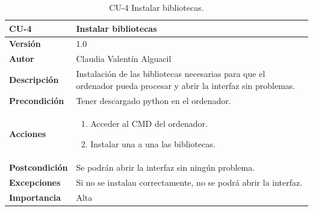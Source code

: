 \begin{table}[p]
	\centering
	\begin{tabularx}{\linewidth}{ p{} p{} }
		\toprule
		\textbf{CU-4} & \textbf{Instalar bibliotecas}\\
		\toprule
		\textbf{Versión}              & 1.0    \\
		\textbf{Autor}                & Claudia Valentín Alguacil \\
		
		\textbf{Descripción}          & Instalación de las bibliotecas necesarias para que el ordenador pueda procesar y abrir la interfaz sin problemas. \\
		\textbf{Precondición}         & Tener descargado python en el ordenador. \\
		\textbf{Acciones}             &
		\begin{enumerate}
			\def\labelenumi{\arabic{enumi}.}
			\tightlist
			\item Acceder al CMD del ordenador.
			\item Instalar una a una las bibliotecas.
		\end{enumerate}\\
		\textbf{Postcondición}        &  Se podrán abrir la interfaz sin ningún problema. \\
		\textbf{Excepciones}          & Si no se instalan correctamente, no se podrá abrir la interfaz. \\
		\textbf{Importancia}          & Alta \\
		\bottomrule
	\end{tabularx}
	\caption{CU-4 Instalar bibliotecas.}
\end{table}

